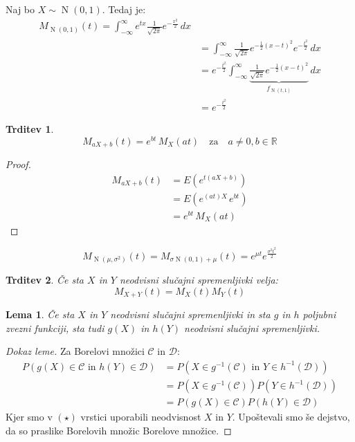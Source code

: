 \documentclass[12pt]{book}
\theoremstyle{definition}
\theoremstyle{plain}
\theoremstyle{plain}
\newtheorem{trditev}{Trditev}
\theoremstyle{plain}
\newtheorem{lema}{Lema}
\theoremstyle{plain}
\theoremstyle{remark}
\begin{document}
\begin{zgled}
    Naj bo $X \sim \operatorname{N}(0,1)$. Tedaj je: 
    $$
    \begin{aligned}
        M_{\operatorname{N}(0,1)}(t)=\int_{-\infty}^{\infty} e^{t x} \frac{1}{\sqrt{2 \pi}} e^{-\frac{x^2}{2}} \, d x \\
        &=\int_{-\infty}^{\infty} \frac{1}{\sqrt{2 \pi}} e^{-\frac{1}{2}(x-t)^2} e^{-\frac{t^2}{2}} \, d x \\
        &=e^{-\frac{t^2}{2}} \int_{-\infty}^{\infty} \underbrace{\frac{1}{\sqrt{2 \pi}} e^{-\frac{1}{2}(x-t)^2}}_{f_{\operatorname{N}(t,1)}} \, d x \\
        &=e^{-\frac{t^2}{2}}
    \end{aligned}
    $$
\end{zgled}

\begin{trditev}
    $$
    M_{a X+b}(t)=e^{b t} \, M_X(a t) \quad \text{za} \quad a \neq 0, b \in \mathbb{R}
    $$
\end{trditev}

\begin{proof}
    $$
    \begin{aligned}
        M_{a X+b}(t)&=E\left(e^{t(a X+b)}\right) \\
        &=E\left(e^{(a t) X} \, e^{b t}\right) \\
        &=e^{b t} \, M_X(a t)
    \end{aligned}
    $$
\end{proof}

\begin{zgled}
    $$
    M_{\operatorname{N}\left(\mu, \sigma^2\right)}(t)=M_{\sigma \operatorname{N}(0,1)+\mu}(t)=e^{\mu t} e^{\frac{\sigma^2 t^2}{2}}
    $$
\end{zgled}

\begin{trditev}
    Če sta $X$ in $Y$ neodvisni slučajni spremenljivki velja:
    $$
    M_{X+Y}(t)=M_X(t) M_Y(t)
    $$
\end{trditev}

\begin{lema}
    Če sta $X$ in $Y$ neodvisni slučajni spremenljivki in sta $g$ in $h$ poljubni zvezni funkciji, sta tudi $g(X)$ in $h(Y)$ neodvisni slučajni spremenljivki. 
\end{lema}

\begin{proof}[Dokaz leme]
    Za Borelovi množici $\mathcal{C}$ in $\mathcal{D}$:
    \begin{align*}
        P(g(X) \in \mathcal{C} \text { in } h(Y) \in \mathcal{D})&=P\left(X \in g^{-1}(\mathcal{C}) \text { in } Y \in h^{-1}(\mathcal{D})\right) \\
        &=P\left(X \in g^{-1}(\mathcal{C})\right) P\left(Y \in h^{-1}(\mathcal{D})\right) \tag{$\star$}\\
        &=P(g(X) \in \mathcal{C}) P(h(Y) \in \mathcal{D})
    \end{align*}
    Kjer smo v $(\star)$ vrstici uporabili neodvisnost $X$ in $Y$. Upoštevali smo še dejstvo, da so praslike Borelovih množic Borelove množice.
\end{proof}
\end{document}
